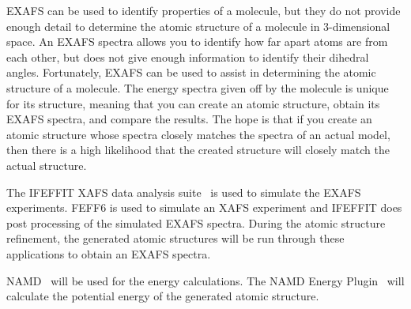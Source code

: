 EXAFS can be used to identify properties of a molecule, but they do not provide enough detail to determine the atomic structure of a molecule in 3-dimensional space. An EXAFS spectra allows you to identify how far apart atoms are from each other, but does not give enough information to identify their dihedral angles. Fortunately, EXAFS can be used to assist in determining the atomic structure of a molecule. The energy spectra given off by the molecule is unique for its structure, meaning that you can create an atomic structure, obtain its EXAFS spectra, and compare the results. The hope is that if you create an atomic structure whose spectra closely matches the spectra of an actual model, then there is a high likelihood that the created structure will closely match the actual structure.

The IFEFFIT XAFS data analysis suite~\cite{ifeffit} is used to simulate the EXAFS experiments. FEFF6 is used to simulate an XAFS experiment and IFEFFIT does post processing of the simulated EXAFS spectra. During the atomic structure refinement, the generated atomic structures will be run through these applications to obtain an EXAFS spectra.

NAMD~\cite{namd} will be used for the energy calculations. The NAMD Energy Plugin~\cite{namdEnergy}  will calculate the potential energy of the generated atomic structure.